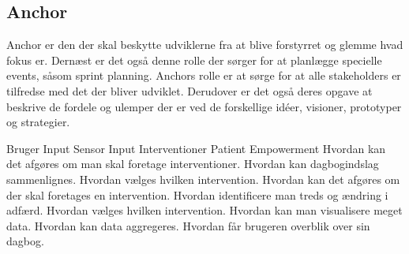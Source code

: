 \subsection{Anchor}
Anchor er den der skal beskytte udviklerne fra at blive forstyrret og glemme hvad fokus er.
Dernæst er det også denne rolle der sørger for at planlægge specielle events, såsom sprint planning.
Anchors rolle er at sørge for at alle stakeholders er tilfredse med det der bliver udviklet.
Derudover er det også deres opgave at beskrive de fordele og ulemper der er ved de forskellige idéer, visioner, prototyper og strategier.

\coord
  {Bruger Input}
  {Sensor Input}
  {Interventioner}
  {Patient Empowerment}
  {Hvordan kan det afgøres om man skal foretage interventioner.
    Hvordan kan dagbogindslag sammenlignes.
    Hvordan vælges hvilken intervention.}
  {Hvordan kan det afgøres om der skal foretages en intervention.
    Hvordan identificere man treds og ændring i adfærd.
    Hvordan vælges hvilken intervention.}
  {Hvordan kan man visualisere meget data.
    Hvordan kan data aggregeres.}
  {Hvordan får brugeren overblik over sin dagbog.}
